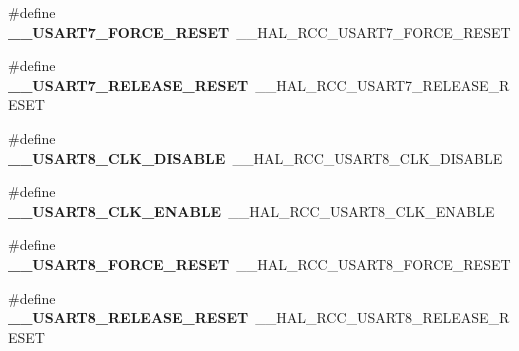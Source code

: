 \begin{DoxyCompactItemize}
\item 
\hypertarget{group___h_a_l___r_c_c___aliased_ga06c91b1d0f80f1d44dd7718aa8145eec}{\#define {\bfseries \-\_\-\-\_\-\-U\-S\-A\-R\-T7\-\_\-\-F\-O\-R\-C\-E\-\_\-\-R\-E\-S\-E\-T}~\-\_\-\-\_\-\-H\-A\-L\-\_\-\-R\-C\-C\-\_\-\-U\-S\-A\-R\-T7\-\_\-\-F\-O\-R\-C\-E\-\_\-\-R\-E\-S\-E\-T}\label{group___h_a_l___r_c_c___aliased_ga06c91b1d0f80f1d44dd7718aa8145eec}

\item 
\hypertarget{group___h_a_l___r_c_c___aliased_gafa09a5eefe6ef876ceb35c5c7e927b90}{\#define {\bfseries \-\_\-\-\_\-\-U\-S\-A\-R\-T7\-\_\-\-R\-E\-L\-E\-A\-S\-E\-\_\-\-R\-E\-S\-E\-T}~\-\_\-\-\_\-\-H\-A\-L\-\_\-\-R\-C\-C\-\_\-\-U\-S\-A\-R\-T7\-\_\-\-R\-E\-L\-E\-A\-S\-E\-\_\-\-R\-E\-S\-E\-T}\label{group___h_a_l___r_c_c___aliased_gafa09a5eefe6ef876ceb35c5c7e927b90}

\item 
\hypertarget{group___h_a_l___r_c_c___aliased_ga156c3013249722a6533154a3c34cb8e5}{\#define {\bfseries \-\_\-\-\_\-\-U\-S\-A\-R\-T8\-\_\-\-C\-L\-K\-\_\-\-D\-I\-S\-A\-B\-L\-E}~\-\_\-\-\_\-\-H\-A\-L\-\_\-\-R\-C\-C\-\_\-\-U\-S\-A\-R\-T8\-\_\-\-C\-L\-K\-\_\-\-D\-I\-S\-A\-B\-L\-E}\label{group___h_a_l___r_c_c___aliased_ga156c3013249722a6533154a3c34cb8e5}

\item 
\hypertarget{group___h_a_l___r_c_c___aliased_gadd38e5a3ecd0dd0f8118af0447a096c9}{\#define {\bfseries \-\_\-\-\_\-\-U\-S\-A\-R\-T8\-\_\-\-C\-L\-K\-\_\-\-E\-N\-A\-B\-L\-E}~\-\_\-\-\_\-\-H\-A\-L\-\_\-\-R\-C\-C\-\_\-\-U\-S\-A\-R\-T8\-\_\-\-C\-L\-K\-\_\-\-E\-N\-A\-B\-L\-E}\label{group___h_a_l___r_c_c___aliased_gadd38e5a3ecd0dd0f8118af0447a096c9}

\item 
\hypertarget{group___h_a_l___r_c_c___aliased_ga3a8aed7e7c3dbbb9f4f93d298a813a13}{\#define {\bfseries \-\_\-\-\_\-\-U\-S\-A\-R\-T8\-\_\-\-F\-O\-R\-C\-E\-\_\-\-R\-E\-S\-E\-T}~\-\_\-\-\_\-\-H\-A\-L\-\_\-\-R\-C\-C\-\_\-\-U\-S\-A\-R\-T8\-\_\-\-F\-O\-R\-C\-E\-\_\-\-R\-E\-S\-E\-T}\label{group___h_a_l___r_c_c___aliased_ga3a8aed7e7c3dbbb9f4f93d298a813a13}

\item 
\hypertarget{group___h_a_l___r_c_c___aliased_ga2348b929f206d24fa5bd3c4b3315b13d}{\#define {\bfseries \-\_\-\-\_\-\-U\-S\-A\-R\-T8\-\_\-\-R\-E\-L\-E\-A\-S\-E\-\_\-\-R\-E\-S\-E\-T}~\-\_\-\-\_\-\-H\-A\-L\-\_\-\-R\-C\-C\-\_\-\-U\-S\-A\-R\-T8\-\_\-\-R\-E\-L\-E\-A\-S\-E\-\_\-\-R\-E\-S\-E\-T}\label{group___h_a_l___r_c_c___aliased_ga2348b929f206d24fa5bd3c4b3315b13d}


\end{DoxyCompactItemize}
